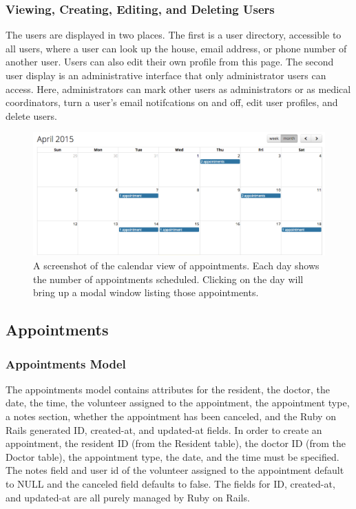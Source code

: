 \documentclass{sig-alternate}
\begin{document}
\subsubsection{Viewing, Creating, Editing, and Deleting Users}
The users are displayed in two places. The first is a user directory, accessible to all users, where a user can look up the house, email address, or phone number of another user. Users can also edit their own profile from this page. The second user display is an administrative interface that only administrator users can access. Here, administrators can mark other users as administrators or as medical coordinators, turn a user's email notifcations on and off, edit user profiles, and delete users.

\begin{figure}
\includegraphics[scale=0.4]{Calendar}
\caption{A screenshot of the calendar view of appointments. Each day shows the number of appointments scheduled. Clicking on the day will bring up a modal window listing those appointments.}
\end{figure}

\subsection{Appointments}

\subsubsection{Appointments Model}
The appointments model contains attributes for the resident, the doctor, the date, the time, the volunteer assigned to the appointment, the appointment type, a notes section, whether the appointment has been canceled, and the Ruby on Rails generated ID, created-at, and updated-at fields. In order to create an appointment, the resident ID (from the Resident table), the doctor ID (from the Doctor table), the appointment type, the date, and the time must be specified. The notes field and user id of the volunteer assigned to the appointment default to NULL and the canceled field defaults to false. The fields for ID, created-at, and updated-at are all purely managed by Ruby on Rails. 
\end{document}
